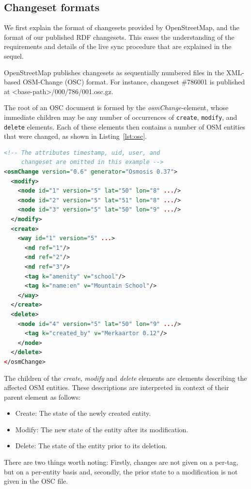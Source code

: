 
\subsection{Changeset formats}
\label{sec:changeset-formats}
We first explain the format of changesets provided by
OpenStreetMap, and the format of our published RDF changesets.
This eases the understanding of the requirements and details of the live sync
procedure that are explained in the sequel.

OpenStreetMap publishes changesets as sequentially numbered files in the
XML-based OSM-Change (OSC) format. For instance, changeset \#786001 is published
at <base-path>/000/786/001.osc.gz.

The root of an OSC document is formed by the \emph{osmChange}-element,
whose immediate children may be any number of occurrences of \texttt{create},
\texttt{modify}, and \texttt{delete} elements. Each of these
elements then contains a number of OSM entities that were changed, as shown in
Listing~\ref{lst:osc}.
\begin{scriptsize}
\begin{lstlisting}[label=lst:osc, language=XML, caption=Example of an OSM change file.]
<!-- The attributes timestamp, uid, user, and
     changeset are omitted in this example -->
<osmChange version="0.6" generator="Osmosis 0.37">
  <modify>
    <node id="1" version="5" lat="50" lon="8" .../>
    <node id="2" version="5" lat="51" lon="8" .../>
    <node id="3" version="5" lat="50" lon="9" .../>
  </modify>
  <create>
    <way id="1" version="5" ...>
      <nd ref="1"/>
      <nd ref="2"/>
      <nd ref="3"/>
      <tag k="amenity" v="school"/>
      <tag k="name:en" v="Mountain School"/>
    </way>
  </create>
  <delete>
    <node id="4" version="5" lat="50" lon="9" .../>
      <tag k="created_by" v="Merkaartor 0.12"/>
    </node>
  </delete>
</osmChange>
\end{lstlisting}
\end{scriptsize}
The children of the \emph{create}, \emph{modify} and \emph{delete} elements
are elements describing the affected OSM entities. These descriptions
are interpreted in context of their parent element as follows:
\begin{itemize}
  \item Create: The state of the newly created entity.
  \item Modify: The new state of the entity after its modification.
  \item Delete: The state of the entity prior to its deletion.
\end{itemize}
There are two things worth noting: Firstly, changes are not given on a per-tag,
but on a per-entity basis and, secondly, the prior state to a modification is not
given in the OSC file.

